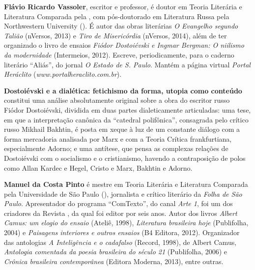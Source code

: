 
\textbf{Flávio Ricardo Vassoler}, escritor e professor, é doutor em Teoria Literária e Literatura Comparada pela , com pós-doutorado em Literatura Russa pela Northwestern University (). É autor das obras literárias \emph{O Evangelho segundo Talião} (nVersos, 2013) e \emph{Tiro de Misericórdia} (nVersos, 2014), além de ter organizado o livro de ensaios \emph{Fiódor Dostoiévski e Ingmar Bergman: O niilismo da modernidade} (Intermeios, 2012). Escreve, periodicamente, para o caderno literário ``Aliás'', do jornal \emph{O Estado de S. Paulo}. Mantém a página virtual \emph{Portal Heráclito} (\emph{www.portalheraclito.com.br}).

\textbf{Dostoiévski e a dialética: fetichismo da forma, utopia como conteúdo} constitui uma análise absolutamente original sobre a obra do escritor russo Fiódor Dostoiévski, dividida em duas partes dialeticamente articuladas: uma tese, em que a interpretação canônica da ``catedral polifônica'', consagrada pelo crítico russo Mikhail Bakhtin, é posta em xeque à luz de um constante diálogo com a forma mercadoria analisada por Marx e com a Teoria Crítica frankfurtiana, especialmente Adorno; e uma antítese, que pensa as complexas relações de Dostoiévski com o socialismo e o cristianismo, havendo a contraposição de polos como Allan Kardec e Hegel, Cristo e Marx, Bakhtin e Adorno.

\textbf{Manuel da Costa Pinto} é mestre em Teoria Literária e Literatura Comparada pela Universidade de São Paulo (), jornalista e crítico literário da \emph{Folha de São Paulo}. Apresentador do programa ``ComTexto'', do canal \emph{Arte 1}, foi um dos criadores da Revista , da qual foi editor por seis anos. Autor dos livros \emph{Albert Camus: um elogio do ensaio} (Ateliê, 1998), \emph{Literatura brasileira hoje} (Publifolha, 2004) e \emph{Paisagens interiores e outros ensaios} (B4 Editora, 2012). Organizador das antologias \emph{A Inteligência e o cadafalso} (Record, 1998), de Albert Camus, \emph{Antologia comentada da poesia brasileira do século 21} (Publifolha, 2006) e \emph{Crônica brasileira contemporânea} (Editora Moderna, 2013), entre outras.






